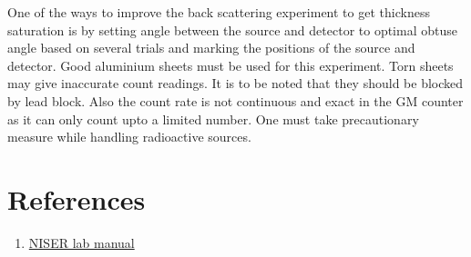 \documentclass[a4paper, amsfonts, amssymb, amsmath, reprint, showkeys, nofootinbib, twoside]{revtex4-1}
\begin{document}
One of the ways to improve the back scattering experiment to get thickness saturation is by setting angle between the source and detector to optimal obtuse angle based on several trials and marking the positions of the source and detector.  Good aluminium sheets must be used for this experiment. Torn sheets may give inaccurate count readings. It is to be noted that they should be blocked by lead block. Also the count rate is not continuous and exact in the GM counter as it can only count upto a limited number. One must take precautionary measure while handling
radioactive sources.

\section{References}
\begin{enumerate}
\item{\url{NISER lab manual}}
\end{enumerate}
\end{document}
